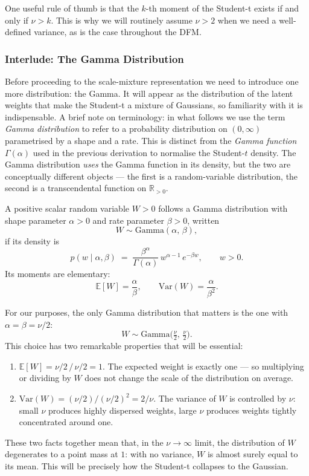 \documentclass[11pt, a4paper, oneside]{article}
\begin{document}
One useful rule of thumb is that the $k$-th moment of the Student-t exists
if and only if $\nu > k$. This is why we will routinely assume $\nu > 2$
when we need a well-defined variance, as is the case throughout the DFM.

\subsubsection{Interlude: The Gamma Distribution}

Before proceeding to the scale-mixture representation we need to introduce
one more distribution: the Gamma. It will appear as the distribution of
the latent weights that make the Student-t a mixture of Gaussians, so
familiarity with it is indispensable.
A brief note on terminology: in what follows we use the term 
\emph{Gamma distribution} to refer to a probability distribution on 
$(0, \infty)$ parametrised by a shape and a rate. This is distinct from 
the \emph{Gamma function} $\Gamma(\alpha)$ used in the previous 
derivation to normalise the Student-$t$ density. The Gamma distribution 
\emph{uses} the Gamma function in its density, but the two are 
conceptually different objects — the first is a random-variable 
distribution, the second is a transcendental function on $\mathbb{R}_{>0}$.

A positive scalar random variable $W > 0$ follows a Gamma distribution with
shape parameter $\alpha > 0$ and rate parameter $\beta > 0$, written
\[
W \sim \text{Gamma}(\alpha,\, \beta),
\]
if its density is
\begin{equation}
p(w \mid \alpha, \beta) \;=\;
\frac{\beta^{\alpha}}{\Gamma(\alpha)}\, w^{\alpha - 1}\, e^{-\beta w},
\qquad w > 0.
\label{eq:gamma}
\end{equation}
Its moments are elementary:
\[
\mathbb{E}[W] = \frac{\alpha}{\beta}, \qquad
\mathrm{Var}(W) = \frac{\alpha}{\beta^{2}}.
\]

For our purposes, the only Gamma distribution that matters is the one with
$\alpha = \beta = \nu/2$:
\[
W \sim \text{Gamma}\!\big(\tfrac{\nu}{2},\, \tfrac{\nu}{2}\big).
\]
This choice has two remarkable properties that will be essential:
\begin{enumerate}[leftmargin=1.5em, itemsep=2pt]
    \item $\mathbb{E}[W] = \nu/2 \,/\, \nu/2 = 1$. The expected weight is
          exactly one — so multiplying or dividing by $W$ does not change
          the scale of the distribution on average.
    \item $\mathrm{Var}(W) = (\nu/2)/(\nu/2)^{2} = 2/\nu$. The variance of
          $W$ is controlled by $\nu$: small $\nu$ produces highly dispersed
          weights, large $\nu$ produces weights tightly concentrated around
          one.
\end{enumerate}
These two facts together mean that, in the $\nu \to \infty$ limit, the
distribution of $W$ degenerates to a point mass at $1$: with no variance,
$W$ is almost surely equal to its mean. This will be precisely how the
Student-t collapses to the Gaussian.
\end{document}

